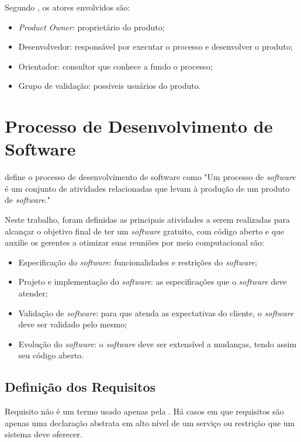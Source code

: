 Segundo , os atores envolvidos são:

\begin{itemize}
	\item \textit{Product Owner}: proprietário do produto;
	\item Desenvolvedor: responsável por executar o processo e desenvolver o produto;
	\item Orientador: consultor que conhece a fundo o processo;
	\item Grupo de validação: possíveis usuários do produto.
\end{itemize}

\section{Processo de Desenvolvimento de Software}
\label{sec:processo_de_desenvolvimento_de_software}

 define o processo de desenvolvimento de software como "Um processo de \textit{software} é um conjunto de atividades relacionadas que levam à produção de um produto de \textit{software}."

Neste trabalho, foram definidas as principais atividades a serem realizadas para alcançar o objetivo final de ter um \textit{software} gratuito, com código aberto e que auxilie os gerentes a otimizar suas reuniões por meio computacional são:

\begin{itemize}
    \item Especificação do \textit{software}: funcionalidades e restrições do \textit{software};
    \item Projeto e implementação do \textit{software}: as especificações que o \textit{software} deve atender;
    \item Validação de \textit{software}: para que atenda as expectativas do cliente, o \textit{software} deve ser validado pelo mesmo;
    \item Evolução do \textit{software}: o \textit{software} deve ser extensível a mudanças, tendo assim seu código aberto.
\end{itemize}

\subsection{Definição dos Requisitos}

Requisito não é um termo usado apenas pela \imprimircurso. Há casos em que requisitos são apenas uma declaração abstrata em alto nível de um serviço ou restrição que um sistema deve oferecer.

